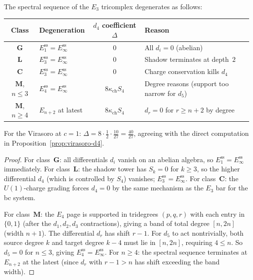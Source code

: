 \begin{proposition}
\label{prop:e3-spectral-degeneration}
The spectral sequence of the $E_3$ tricomplex degenerates as follows:
\begin{center}
\small
\renewcommand{\arraystretch}{1.15}
\begin{tabular}{clcl}
\toprule
\textbf{Class} & \textbf{Degeneration} & \textbf{$d_4$ coefficient $\Delta$} & \textbf{Reason} \\
\midrule
$\mathbf{G}$ & $E^{\mathrm{ss}}_1 = E^{\mathrm{ss}}_\infty$ & $0$ & All $d_i = 0$ (abelian) \\
$\mathbf{L}$ & $E^{\mathrm{ss}}_3 = E^{\mathrm{ss}}_\infty$ & $0$ & Shadow terminates at depth~$2$ \\
$\mathbf{C}$ & $E^{\mathrm{ss}}_3 = E^{\mathrm{ss}}_\infty$ & $0$ & Charge conservation kills $d_4$ \\
$\mathbf{M}$, $n \leq 3$ & $E^{\mathrm{ss}}_4 = E^{\mathrm{ss}}_\infty$ & $8\kappa_{\mathrm{ch}} S_4$ & Degree reasons (support too narrow for $d_5$) \\
$\mathbf{M}$, $n \geq 4$ & $E_{n+2}$ at latest & $8\kappa_{\mathrm{ch}} S_4$ & $d_r = 0$ for $r \geq n+2$ by degree \\
\bottomrule
\end{tabular}
\end{center}
For the Virasoro at $c = 1$: $\Delta = 8 \cdot \tfrac{1}{2} \cdot \tfrac{10}{27} = \tfrac{40}{27}$, agreeing with the direct computation in Proposition~\ref{prop:virasoro-d4}.
\end{proposition}

\begin{proof}
For class~$\mathbf{G}$: all differentials $d_i$ vanish on an abelian algebra, so $E^{\mathrm{ss}}_1 = E^{\mathrm{ss}}_\infty$ immediately. For class~$\mathbf{L}$: the shadow tower has $S_k = 0$ for $k \geq 3$, so the higher differential $d_4$ (which is controlled by $S_4$) vanishes; $E^{\mathrm{ss}}_3 = E^{\mathrm{ss}}_\infty$. For class~$\mathbf{C}$: the $U(1)$-charge grading forces $d_4 = 0$ by the same mechanism as the $E_3$ bar for the bc system.

For class~$\mathbf{M}$: the $E_4$ page is supported in tridegrees $(p,q,r)$ with each entry in $\{0, 1\}$ (after the $d_1, d_2, d_3$ contractions), giving a band of total degree $[n, 2n]$ (width $n+1$). The differential $d_r$ has shift $r-1$. For $d_5$ to act nontrivially, both source degree $k$ and target degree $k - 4$ must lie in $[n, 2n]$, requiring $4 \leq n$. So $d_5 = 0$ for $n \leq 3$, giving $E^{\mathrm{ss}}_4 = E^{\mathrm{ss}}_\infty$. For $n \geq 4$: the spectral sequence terminates at $E_{n+2}$ at the latest (since $d_r$ with $r - 1 > n$ has shift exceeding the band width).

\end{proof}


